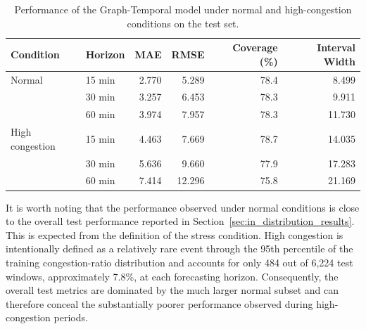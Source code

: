 \begin{table}[t]
    \centering
    \caption{Performance of the Graph-Temporal model under normal and
    high-congestion conditions on the test set.}
    \label{tab:congestion_results}
    \begin{tabular}{llrrrr}
        \toprule
        Condition & Horizon &
        MAE & RMSE & Coverage (\%) & Interval Width \\
        \midrule
        Normal
        & 15 min & 2.770 & 5.289 & 78.4 & 8.499 \\
        & 30 min & 3.257 & 6.453 & 78.3 & 9.911 \\
        & 60 min & 3.974 & 7.957 & 78.3 & 11.730 \\
        \midrule
        High congestion
        & 15 min & 4.463 & 7.669 & 78.7 & 14.035 \\
        & 30 min & 5.636 & 9.660 & 77.9 & 17.283 \\
        & 60 min & 7.414 & 12.296 & 75.8 & 21.169 \\
        \bottomrule
    \end{tabular}
\end{table}

It is worth noting that the performance observed under normal conditions is
close to the overall test performance reported in
Section~\ref{sec:in_distribution_results}. This is expected from the
definition of the stress condition. High congestion is intentionally defined
as a relatively rare event through the 95th percentile of the training
congestion-ratio distribution and accounts for only 484 out of 6,224 test
windows, approximately 7.8\%, at each forecasting horizon. Consequently,
the overall test metrics are dominated by the much larger normal subset and
can therefore conceal the substantially poorer performance observed during
high-congestion periods.

